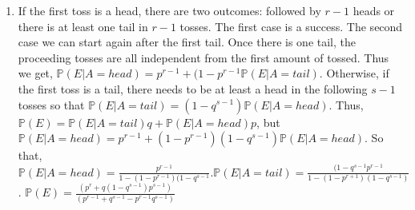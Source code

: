 \documentclass{article}
\begin{document}
\begin{enumerate}
\begin{enumerate}
    \end{enumerate}
    
    \setcounter{enumi}{16}
    \item 

    If the first toss is a head, there are two outcomes: followed by $r-1$ heads or there is at least one tail in $r-1$ tosses. The first case is a success. The second case we can start again after the first tail. Once there is one tail, the proceeding tosses are all independent from the first amount of tossed. Thus we get, $\mathbb{P}(E|A = head)=p^{r-1}+(1-p^{r-1}\mathbb{P}(E|A= tail)$. Otherwise, if the first toss is a tail, there needs to be at least a head in the following $s-1$ tosses so that $\mathbb{P}(E|A = tail)= (1-q^{s-1})\mathbb{P}(E|A=head)$. Thus, $\mathbb{P}(E)= \mathbb{P}(E|A=tail)q+\mathbb{P}(E|A=head)p$, but $\mathbb{P}(E|A=head)=p^{r-1}+(1-p^{r-1})(1-q^{s-1})\mathbb{P}(E|A=head)$. So that, $\mathbb{P}(E|A= head)=\frac{p^{r-1}}{1-(1-p^{r-1})(1-q^{s-1}}. \mathbb{P}(E|A=tail)=\frac{(1-q^{s-1}p^{r-1}}{1-(1-p^{r+1})(1-q^{s-1})}$. $\mathbb{P}(E)=\frac{(p^r+q(1-q^{s-1})p^{s-1})}{(p^{r-1}+q^{s-1}-p^{r-1}q^{s-1})}$


\end{enumerate}
\end{document}
